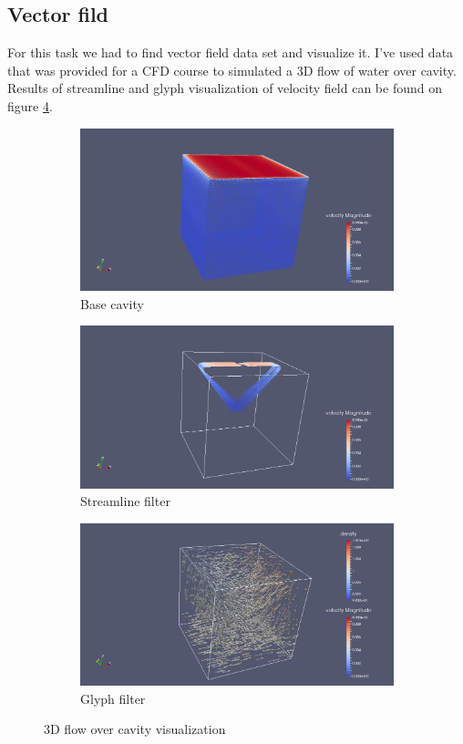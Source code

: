 \documentclass{article}
\begin{document}
\subsection{Vector fild}
For this task we had to find vector field data set and visualize it. I've used data that was provided for a CFD course to simulated a 3D flow of water over cavity. Results of streamline and glyph visualization of velocity field can be found on figure \ref{fig:8}.
\begin{figure}
	\centering
	\begin{subfigure}[h]{0.45\textwidth}
		\includegraphics[width=\textwidth]{3d-cavity.png}
		\caption{Base cavity}
		\label{fig:cavbase}
	\end{subfigure}
	\begin{subfigure}[h]{0.45\textwidth}
		\includegraphics[width=\textwidth]{3d-cavity-streamlines.png}
		\caption{Streamline filter}
		\label{fig:strmlines}
	\end{subfigure}
	\begin{subfigure}[h]{0.6\textwidth}
		\includegraphics[width=\textwidth]{3d-cavity-glyph.png}
		\caption{Glyph filter}
		\label{fig:glyph}
	\end{subfigure}
	\caption{3D flow over cavity visualization}\label{fig:8}
\end{figure}
\end{document}
